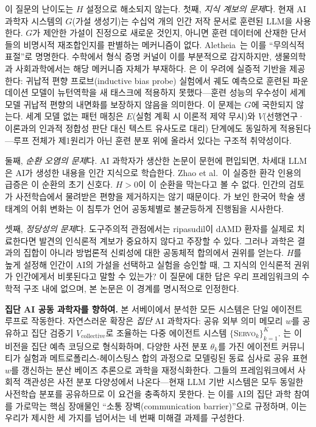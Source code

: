 \documentclass[11pt]{article}
\newcommand{\framework}{\textsc{Servo}}
\begin{document}
이 질문의 난이도는 $H$ 설정으로 해소되지 않는다. 첫째, \emph{지식 계보의 문제}다. 현재 AI 과학자 시스템의 $G$(가설 생성기)는 수십억 개의 인간 저작 문서로 훈련된 LLM을 사용한다. $G$가 제안한 가설이 진정으로 새로운 것인지, 아니면 훈련 데이터에 산재한 단서들의 비명시적 재조합인지를 판별하는 메커니즘이 없다. Aletheia~\citep{google2026aletheia}는 이를 ``무의식적 표절''로 명명한다. 수학에서 형식 증명 커널이 이를 부분적으로 감지하지만, 생물의학과 사회과학에서는 해당 메커니즘 자체가 부재하다. \citet{vafa2025foundationmodel}은 이 우려에 실증적 기반을 제공한다: 귀납적 편향 프로브(inductive bias probe) 실험에서 궤도 예측으로 훈련된 파운데이션 모델이 뉴턴역학을 새 태스크에 적용하지 못했다---훈련 성능의 우수성이 세계 모델 귀납적 편향의 내면화를 보장하지 않음을 의미한다. 이 문제는 $G$에 국한되지 않는다. 세계 모델 없는 패턴 매칭은 $E$(실험 계획 시 이론적 제약 무시)와 $V$(선행연구·이론과의 인과적 정합성 판단 대신 텍스트 유사도로 대리) 단계에도 동일하게 적용된다---루프 전체가 제1원리가 아닌 훈련 분포 위에 올라서 있다는 구조적 취약성이다.

둘째, \emph{순환 오염의 문제}다. AI 과학자가 생산한 논문이 문헌에 편입되면, 차세대 LLM은 AI가 생성한 내용을 인간 지식으로 학습한다. Zhao et al.~\citep{zhao2026hallucinations}이 실증한 환각 인용의 급증은 이 순환의 초기 신호다. $H > 0$이 이 순환을 막는다고 볼 수 없다. 인간의 검토가 사전학습에서 물려받은 편향을 제거하지는 않기 때문이다. \citet{koo2026kci}가 보인 한국어 학술 생태계의 어휘 변화는 이 침투가 언어 공동체별로 불균등하게 진행됨을 시사한다.

셋째, \emph{정당성의 문제}다. 도구주의적 관점에서는 ripasudil이 dAMD 환자를 실제로 치료한다면 발견의 인식론적 계보가 중요하지 않다고 주장할 수 있다. 그러나 과학은 결과의 집합이 아니라 방법론적 신뢰성에 대한 공동체적 합의에서 권위를 얻는다. $H$를 높게 설정해 인간이 AI의 가설을 선택하고 실험을 승인할 때, 그 지식의 인식론적 권위가 인간에게서 비롯된다고 말할 수 있는가? 이 질문에 대한 답은 우리 프레임워크의 수학적 구조 내에 없으며, 본 논문은 이 경계를 명시적으로 인정한다.

\textbf{집단 AI 공동 과학자를 향하여.} 본 서베이에서 분석한 모든 시스템은 단일 에이전트 루프로 작동한다. 자연스러운 확장은 \emph{집단} AI 과학자다: 공유 외부 의미 메모리 $w$를 공유하고 집단 검증기 $V_\text{collective}$로 조율하는 다중 에이전트 시스템 $\{$\framework$_k\}_{k=1}^K$. \citet{taniguchi2024cpc}는 이 비전을 집단 예측 코딩으로 형식화하며, 다양한 사전 분포 $\theta_k$를 가진 에이전트 커뮤니티가 실험과 메트로폴리스-헤이스팅스 합의 과정으로 모델링된 동료 심사로 공유 표현 $w$를 갱신하는 분산 베이즈 추론으로 과학을 재정식화한다. 그들의 프레임워크에서 사회적 객관성은 사전 분포 다양성에서 나온다---현재 LLM 기반 시스템은 모두 동일한 사전학습 분포를 공유하므로 이 요건을 충족하지 못한다. \citet{taniguchi2024cpc}는 이를 AI의 집단 과학 참여를 가로막는 핵심 장애물인 ``소통 장벽(communication barrier)''으로 규정하며, 이는 우리가 제시한 세 가지를 넘어서는 네 번째 미해결 과제를 구성한다.
\end{document}
